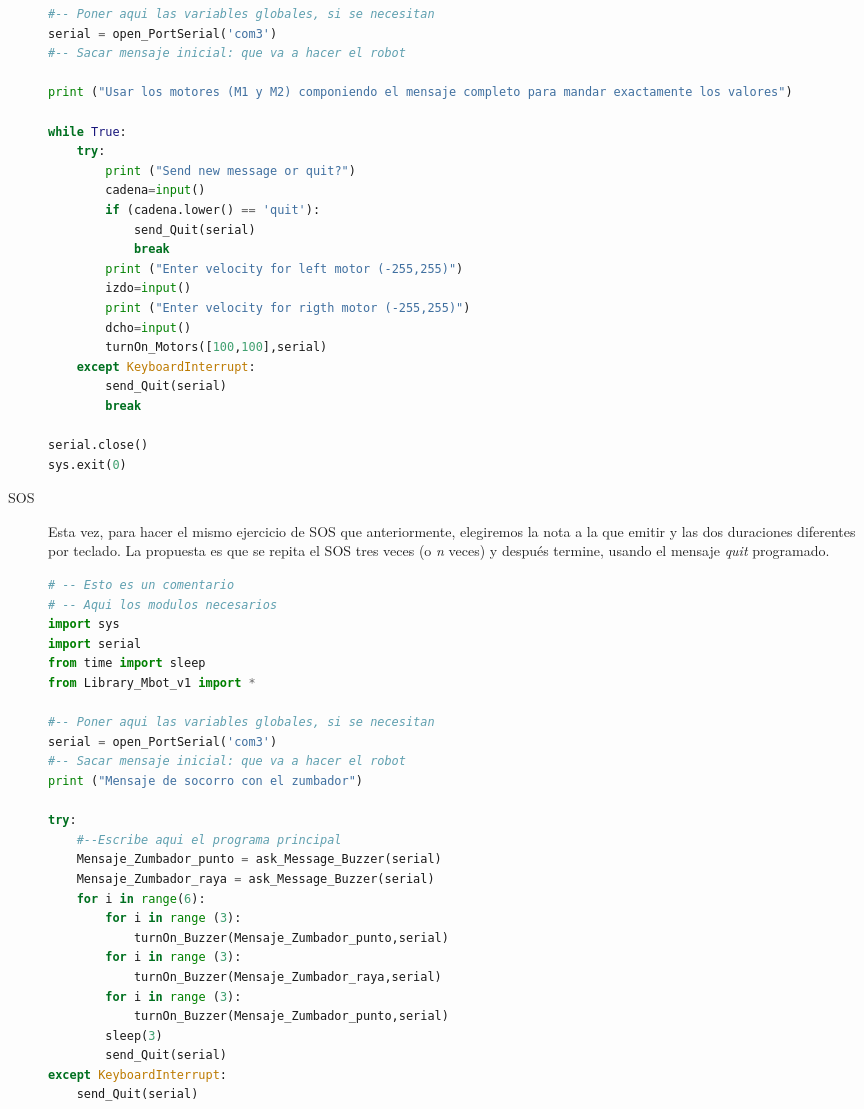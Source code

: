 \begin{description}
\begin{lstlisting}[language=python,caption={Solución de referencia del ejercicio},captionpos=b,tabsize=2]
#-- Poner aqui las variables globales, si se necesitan
serial = open_PortSerial('com3')
#-- Sacar mensaje inicial: que va a hacer el robot

print ("Usar los motores (M1 y M2) componiendo el mensaje completo para mandar exactamente los valores")
	
while True:
	try:
		print ("Send new message or quit?")
		cadena=input()
		if (cadena.lower() == 'quit'):
			send_Quit(serial)
			break
		print ("Enter velocity for left motor (-255,255)")
		izdo=input()
		print ("Enter velocity for rigth motor (-255,255)")
		dcho=input()	
		turnOn_Motors([100,100],serial)
	except KeyboardInterrupt:
		send_Quit(serial)
		break
	
serial.close()
sys.exit(0)
\end{lstlisting}
	\item [SOS] Esta vez, para hacer el mismo ejercicio de SOS que anteriormente, elegiremos la nota a la que emitir y las dos duraciones diferentes por teclado. La propuesta es que se repita el SOS tres veces (o \textit{n} veces) y después termine, usando el mensaje \textit{quit} programado.
\begin{lstlisting}[language=python,caption={Solución de referencia del ejercicio},captionpos=b,tabsize=2]
# -- Esto es un comentario		
# -- Aqui los modulos necesarios
import sys
import serial
from time import sleep
from Library_Mbot_v1 import *

#-- Poner aqui las variables globales, si se necesitan
serial = open_PortSerial('com3')
#-- Sacar mensaje inicial: que va a hacer el robot
print ("Mensaje de socorro con el zumbador")

try:
	#--Escribe aqui el programa principal
	Mensaje_Zumbador_punto = ask_Message_Buzzer(serial)
	Mensaje_Zumbador_raya = ask_Message_Buzzer(serial)
	for i in range(6):
		for i in range (3):
			turnOn_Buzzer(Mensaje_Zumbador_punto,serial)
		for i in range (3):
			turnOn_Buzzer(Mensaje_Zumbador_raya,serial)
		for i in range (3):
			turnOn_Buzzer(Mensaje_Zumbador_punto,serial)
		sleep(3)
		send_Quit(serial)
except KeyboardInterrupt:
	send_Quit(serial)


\end{lstlisting}
\end{description}
